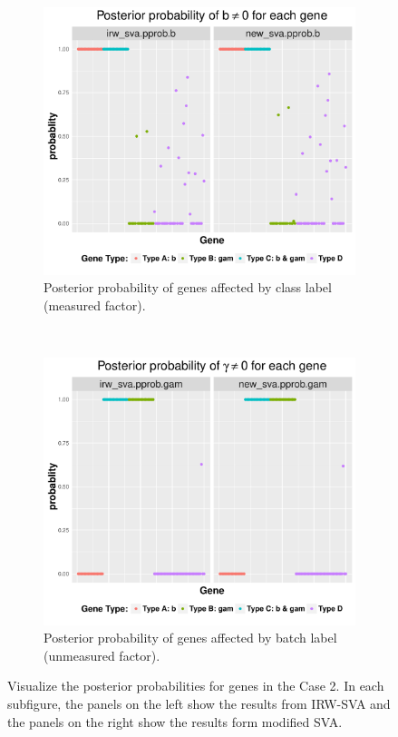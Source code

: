 \documentclass[11pt]{article}
\begin{document}
\begin{figure}[h!]
    \centering
    \begin{subfigure}[t]{0.45\textwidth}
    \centering
    \includegraphics[width = \textwidth]{figures/pprop2_2.pdf}
    \caption{Posterior probability of genes affected by class label (measured factor).}
    \label{fig:pprob2_1}
    \end{subfigure}
    ~
     \begin{subfigure}[t]{0.45\textwidth}
    \centering
    \includegraphics[width = \textwidth]{figures/pprop2_1.pdf}
    \caption{Posterior probability of genes affected by batch label (unmeasured factor).}
    \label{fig:pprob2_2}
    \end{subfigure}
    \caption{Visualize the posterior probabilities for genes in the Case 2. In each subfigure, the panels on the left show the results from IRW-SVA and the panels on the right show the results form modified SVA.}
    \label{fig:visual2}
\end{figure}
\end{document}
